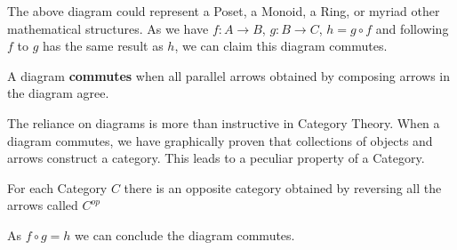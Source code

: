 \documentclass{article}
\begin{document}
\begin{center}
\end{center}
The above diagram could represent a Poset, a Monoid, a Ring, or myriad other mathematical structures. As we have $f: A \to B$, $g: B\to C$, $h = g \circ f$ and following $f$ to $g$ has the same result as $h$, we can claim this diagram commutes.

\begin{definition}
    A diagram \textbf{commutes} when all parallel arrows obtained by composing arrows in the diagram agree.
\end{definition}
The reliance on diagrams is more than instructive in Category Theory. When a diagram commutes, we have graphically proven that collections of objects and arrows construct a category. This leads to a peculiar property of a Category.
\begin{corollary}
 For each Category $C$ there is an opposite category obtained by reversing all the arrows called $C^{op}$
\begin{center}
\end{center}
As $f \circ g = h$ we can conclude the diagram commutes.
\end{corollary}

\end{document}
